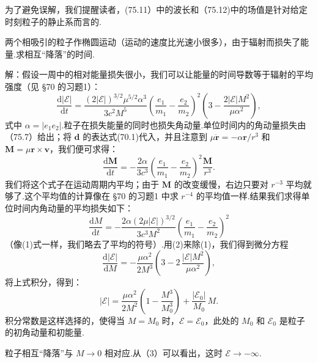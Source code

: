 为了避免误解，我们提醒读者，(75.11）中的波长和（75.12)中的场值是针对给定时刻粒子的静止系而言的.

\begin{xiti}

\quad 两个相吸引的粒子作椭圆运动（运动的速度比光速小很多），由于辐射而损失了能量.求相互“降落”的时间.

解：假设一周中的相对能量损失很小，我们可以让能量的时间导数等于辐射的平均强度（见 §70 的习题1）：
\begin{equation*}
  \frac{\mathrm{d}|\mathcal{E}|}{\mathrm{d}t}
  =\frac{(2|\mathcal{E}|)^{3/2}\mu^{5/2}\alpha^3}{3c^2M^5}
  \left(\frac{e_1}{m_1}-\frac{e_2}{m_2}\right)^{\!2}
  \left(3-\frac{2|\mathcal{E}|M^2}{\mu\alpha^2}\right),
  \tag{1}
\end{equation*}
式中 $\alpha=|e_1e_2|$.粒子在损失能量的同时也损失角动量.单位时间内的角动量损失由（75.7）给出；将 $\boldsymbol{d}$ 的表达式(70.1)代入，并且注意到 $\mu\ddot{\boldsymbol{r}}=-\alpha\boldsymbol{r}/r^3$ 和 $\boldsymbol{M}=\mu\boldsymbol{r}\times\boldsymbol{v}$，我们便可求得：
\begin{equation*}
  \frac{\mathrm{d}\boldsymbol{M}}{\mathrm{d}t}
  =-\frac{2\alpha}{3c^3}\left(\frac{e_1}{m_1}-\frac{e_2}{m_2}\right)^{\!2}
  \frac{\boldsymbol{M}}{r^3}.
\end{equation*}
我们将这个式子在运动周期内平均；由于 $\boldsymbol{M}$ 的改变缓慢，右边只要对 $r^{-3}$ 平均就够了.这个平均值的计算像在 §70 的习题1 中求 $r^{-4}$ 的平均值一样.结果我们求得单位时间内角动量的平均损失如下：
\begin{equation*}
  \frac{\mathrm{d}M}{\mathrm{d}t}
  =-\frac{2\alpha(2\mu|\mathcal{E}|)^{3/2}}{3c^3M^2}
  \left(\frac{e_1}{m_1}-\frac{e_2}{m_2}\right)^{\!2}
  \tag{2}
\end{equation*}
（像(1)式一样，我们略去了平均的符号）.用(2)来除(1)，我们得到微分方程
\begin{equation*}
  \frac{\mathrm{d}|\mathcal{E}|}{\mathrm{d}M}
  =-\frac{\mu\alpha^2}{2M^3}\left(3-2\,\frac{|\mathcal{E}|M^2}{\mu\alpha^2}\right),
\end{equation*}
将上式积分，得到：
\begin{equation*}
  |\mathcal{E}|=\frac{\mu\alpha^2}{2M^2}\left(1-\frac{M^3}{M_0^3}\right)
  +\frac{|\mathcal{E}_0|}{M_0}\,M.
  \tag{3}
\end{equation*}
积分常数是这样选择的，使得当 $M=M_0$ 时，$\mathcal{E}=\mathcal{E}_0$，此处的 $M_0$ 和 $\mathcal{E}_0$ 是粒子的初角动量和初能量.

粒子相互“降落”与 $M\to 0$ 相对应.从（3）可以看出，这时 $\mathcal{E}\to-\infty$.


\end{xiti}

